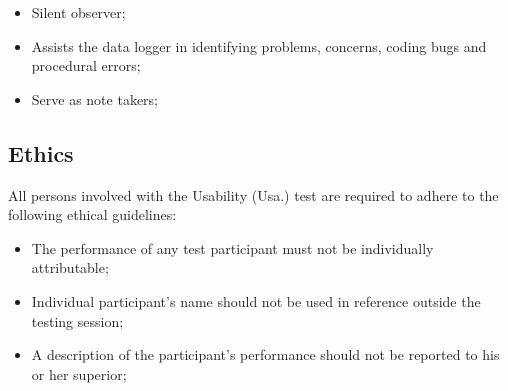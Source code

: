 \begin{itemize}
\item Silent observer;
\item Assists the data logger in identifying problems, concerns, coding bugs and procedural errors;
\item Serve as note takers;
\end{itemize}

\subsection{Ethics}

All persons involved with the Usability (Usa.) test are required to adhere to the following ethical guidelines:

\begin{itemize}
\item The performance of any test participant must not be individually attributable;
\item Individual participant's name should not be used in reference outside the testing session;
\item A description of the participant's performance should not be reported to his or her superior;
\end{itemize}